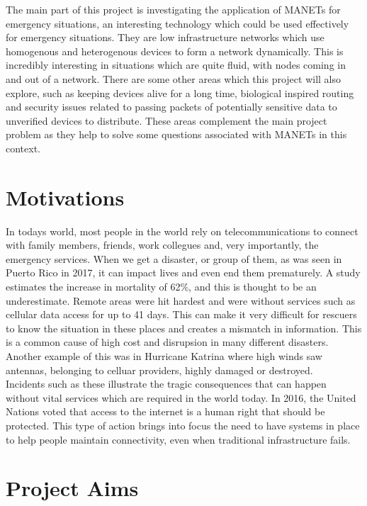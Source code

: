 \documentclass{report}
\begin{document}
The main part of this project is investigating the application of MANETs for emergency situations, an interesting technology which could be used
effectively for emergency situations. They are low infrastructure networks which use homogenous and heterogenous devices to form a 
network dynamically. This is incredibly interesting in situations which are quite fluid, with nodes coming in and out of a network\cite{sun2001mobile}. 
There are some other areas which this project will also explore, such as keeping devices alive for a long time, biological 
inspired routing and security issues related to passing packets of potentially sensitive data to unverified devices to distribute. These areas complement 
the main project problem as they help to solve some questions associated with MANETs in this context.


\section*{Motivations}
In todays world, most people in the world rely on telecommunications to connect with family members, friends, 
work collegues and, very importantly, the emergency services. When we get a disaster, or group of them, as was 
seen in Puerto Rico in 2017, it can impact lives and even end them prematurely. A study estimates the increase in 
mortality of 62\%\cite{kishore2018mortality}, and this is thought to be an underestimate. Remote areas were hit hardest and were without services 
such as cellular data access for up to 41 days. This can make it very difficult for rescuers to know the situation in 
these places and creates a mismatch in information. This is a common cause of high cost and disrupsion in many different disasters. 
Another example of this was in Hurricane Katrina\cite{banipal2006strategic} where high winds saw antennas, belonging to celluar 
providers, highly damaged or destroyed. 
\bigskip\\
Incidents such as these illustrate the tragic consequences that can happen without vital services which are required in the 
world today. In 2016, the United Nations voted that access to the internet is a human right that should be protected\cite{UNResolutionJune2016}. 
This type of action brings into focus the need to have systems in place to help people maintain connectivity, even when traditional infrastructure 
fails. 

\section*{Project Aims}
\end{document}
